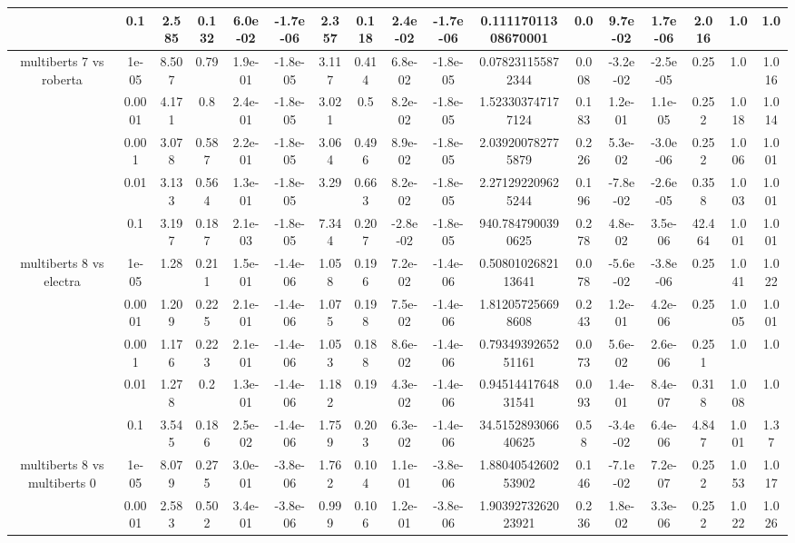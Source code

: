 \begin{tabular}{|c|c|c|c|c|c|c|c|c|c|c|c|c|c|c|c|c|}
 & 0.1 & 2.585 & 0.132 & 6.0e-02 & -1.7e-06 & 2.357 & 0.118 & 2.4e-02 & -1.7e-06 & 0.11117011308670001 & 0.0 & 9.7e-02 & 1.7e-06 & 2.016 & 1.0 & 1.0 \\
\hline
\multirow{5}{*}{multiberts 7 vs roberta } & 1e-05 & 8.507 & 0.79 & 1.9e-01 & -1.8e-05 & 3.117 & 0.414 & 6.8e-02 & -1.8e-05 & 0.078231155872344 & 0.008 & -3.2e-02 & -2.5e-05 & 0.25 & 1.0 & 1.016 \\
 & 0.0001 & 4.171 & 0.8 & 2.4e-01 & -1.8e-05 & 3.021 & 0.5 & 8.2e-02 & -1.8e-05 & 1.523303747177124 & 0.183 & 1.2e-01 & 1.1e-05 & 0.252 & 1.018 & 1.014 \\
 & 0.001 & 3.078 & 0.587 & 2.2e-01 & -1.8e-05 & 3.064 & 0.496 & 8.9e-02 & -1.8e-05 & 2.039200782775879 & 0.226 & 5.3e-02 & -3.0e-06 & 0.252 & 1.006 & 1.001 \\
 & 0.01 & 3.133 & 0.564 & 1.3e-01 & -1.8e-05 & 3.29 & 0.663 & 8.2e-02 & -1.8e-05 & 2.271292209625244 & 0.196 & -7.8e-02 & -2.6e-05 & 0.358 & 1.003 & 1.001 \\
 & 0.1 & 3.197 & 0.187 & 2.1e-03 & -1.8e-05 & 7.344 & 0.207 & -2.8e-02 & -1.8e-05 & 940.7847900390625 & 0.278 & 4.8e-02 & 3.5e-06 & 42.464 & 1.001 & 1.001 \\
\hline
\multirow{5}{*}{multiberts 8 vs electra } & 1e-05 & 1.28 & 0.211 & 1.5e-01 & -1.4e-06 & 1.058 & 0.196 & 7.2e-02 & -1.4e-06 & 0.5080102682113641 & 0.078 & -5.6e-02 & -3.8e-06 & 0.25 & 1.041 & 1.022 \\
 & 0.0001 & 1.209 & 0.225 & 2.1e-01 & -1.4e-06 & 1.075 & 0.198 & 7.5e-02 & -1.4e-06 & 1.812057256698608 & 0.243 & 1.2e-01 & 4.2e-06 & 0.25 & 1.005 & 1.001 \\
 & 0.001 & 1.176 & 0.223 & 2.1e-01 & -1.4e-06 & 1.053 & 0.188 & 8.6e-02 & -1.4e-06 & 0.7934939265251161 & 0.073 & 5.6e-02 & 2.6e-06 & 0.251 & 1.0 & 1.0 \\
 & 0.01 & 1.278 & 0.2 & 1.3e-01 & -1.4e-06 & 1.182 & 0.19 & 4.3e-02 & -1.4e-06 & 0.9451441764831541 & 0.093 & 1.4e-01 & 8.4e-07 & 0.318 & 1.008 & 1.0 \\
 & 0.1 & 3.545 & 0.186 & 2.5e-02 & -1.4e-06 & 1.759 & 0.203 & 6.3e-02 & -1.4e-06 & 34.515289306640625 & 0.58 & -3.4e-02 & 6.4e-06 & 4.847 & 1.001 & 1.37 \\
\hline
\multirow{5}{*}{multiberts 8 vs multiberts 0} & 1e-05 & 8.079 & 0.275 & 3.0e-01 & -3.8e-06 & 1.762 & 0.104 & 1.1e-01 & -3.8e-06 & 1.8804054260253902 & 0.146 & -7.1e-02 & 7.2e-07 & 0.252 & 1.053 & 1.017 \\
 & 0.0001 & 2.583 & 0.502 & 3.4e-01 & -3.8e-06 & 0.999 & 0.106 & 1.2e-01 & -3.8e-06 & 1.9039273262023921 & 0.236 & 1.8e-02 & 3.3e-06 & 0.252 & 1.022 & 1.026 \\

\end{tabular}
